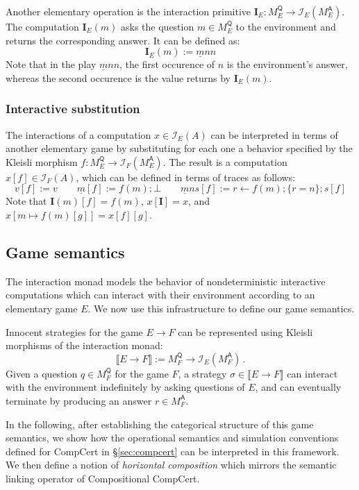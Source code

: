 \documentclass[format=sigplan,authordraft]{acmart}
\newcommand{\kw}[1]{\ensuremath{\mathsf{#1}}}
\begin{document}
Another elementary operation
is the interaction primitive
$\mathbf{I}_E : M_E^\kw{Q} \rightarrow \mathcal{I}_E(M_E^\kw{A})$.
The computation $\mathbf{I}_E(m)$
asks the question $m \in M_E^\kw{Q}$ to the environment
and returns the corresponding answer.
It can be defined as:
\[
    \mathbf{I}_E(m) := \underline{m} n n 
\]
Note that in the play $\underline{m} n n$,
the first occurence of $n$ is the environment's answer,
whereas the second occurence is the value returns by $\mathbf{I}_E(m)$.

\subsubsection{Interactive substitution}

The interactions of a computation $x \in \mathcal{I}_E(A)$
can be interpreted in terms of another elementary game
by substituting for each one a behavior specified by
the Kleisli morphism
$f : M_E^\kw{Q} \rightarrow \mathcal{I}_F(M_E^\kw{A})$.
The result is a computation $x[f] \in \mathcal{I}_F(A)$,
which can be defined in terms of traces as follows:
\[
  v[f] := v \qquad
  \underline{m}[f] := f(m) ; \bot \qquad
  \underline{m}ns[f] := r \leftarrow f(m) ; \{r = n\} ; s[f]
\]
Note that $\mathbf{I}(m)[f] = f(m)$,
$x[\mathbf{I}] = x$,
and $x[m \mapsto f(m)[g]] = x[f][g]$.


\subsection{Game semantics}

The interaction monad
models the behavior of
nondeterministic interactive computations
which can interact with their environment
according to an elementary game $E$.
We now use this infrastructure
to define our game semantics.

Innocent strategies for the game $E \rightarrow F$
can be represented using Kleisli morphisms of
the interaction monad:
\[
  \llbracket E \rightarrow F \rrbracket :=
  M_F^\kw{Q} \rightarrow \mathcal{I}_E(M_F^\kw{A}) \,.
\]
Given a question $q \in M_F^\kw{Q}$ for the game $F$,
a strategy $\sigma \in \llbracket E \rightarrow F \rrbracket$
can interact with the environment
indefinitely by asking questions of $E$,
and can eventually terminate by producing an answer $r \in M_F^\kw{A}$.

In the following,
after establishing the categorical structure
of this game semantics,
we show how
the operational semantics
and simulation conventions
defined for CompCert in \S\ref{sec:compcert}
can be interpreted in this framework.
We then define a notion of \emph{horizontal composition}
which mirrors the semantic linking operator
of Compositional CompCert.
\end{document}
